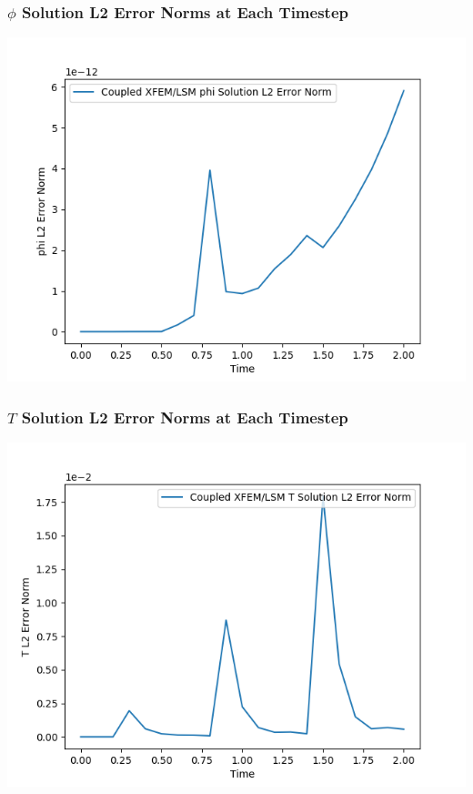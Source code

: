 \documentclass[]{beamer}
\begin{document}
\begin{frame}[t]\frametitle{$\phi$ Solution L2 Error Norms at Each Timestep}
	\begin{center}
		\includegraphics[scale=0.5]{figures/ls-xfem-2D_rz_ls1mat_phi_L2_Errs}
	\end{center}
\end{frame}

\begin{frame}[t]\frametitle{$T$ Solution L2 Error Norms at Each Timestep}
	\begin{center}
		\includegraphics[scale=0.5]{figures/ls-xfem-2D_rz_ls1mat_u_L2_Errs}
	\end{center}
\end{frame}
\end{document}
